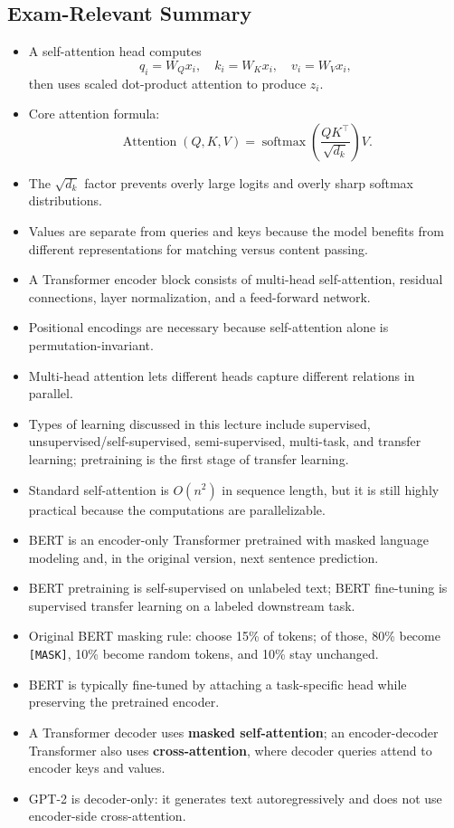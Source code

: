 \documentclass[11pt]{article}
\begin{document}
\subsection{Exam-Relevant Summary}
\begin{itemize}
    \item A self-attention head computes
    \[
    q_i = W_Q x_i,\quad k_i = W_K x_i,\quad v_i = W_V x_i,
    \]
    then uses scaled dot-product attention to produce \(z_i\).
    \item Core attention formula:
    \[
    \operatorname{Attention}(Q,K,V) = \operatorname{softmax}\!\left(\frac{QK^\top}{\sqrt{d_k}}\right)V.
    \]
    \item The \(\sqrt{d_k}\) factor prevents overly large logits and overly sharp softmax distributions.
    \item Values are separate from queries and keys because the model benefits from different representations for matching versus content passing.
    \item A Transformer encoder block consists of multi-head self-attention, residual connections, layer normalization, and a feed-forward network.
    \item Positional encodings are necessary because self-attention alone is permutation-invariant.
    \item Multi-head attention lets different heads capture different relations in parallel.
    \item Types of learning discussed in this lecture include supervised, unsupervised/self-supervised, semi-supervised, multi-task, and transfer learning; pretraining is the first stage of transfer learning.
    \item Standard self-attention is \(O(n^2)\) in sequence length, but it is still highly practical because the computations are parallelizable.
    \item BERT is an encoder-only Transformer pretrained with masked language modeling and, in the original version, next sentence prediction.
    \item BERT pretraining is self-supervised on unlabeled text; BERT fine-tuning is supervised transfer learning on a labeled downstream task.
    \item Original BERT masking rule: choose 15\% of tokens; of those, 80\% become \texttt{[MASK]}, 10\% become random tokens, and 10\% stay unchanged.
    \item BERT is typically fine-tuned by attaching a task-specific head while preserving the pretrained encoder.
    \item A Transformer decoder uses \textbf{masked self-attention}; an encoder-decoder Transformer also uses \textbf{cross-attention}, where decoder queries attend to encoder keys and values.
    \item GPT-2 is decoder-only: it generates text autoregressively and does not use encoder-side cross-attention.
\end{itemize}
\end{document}
